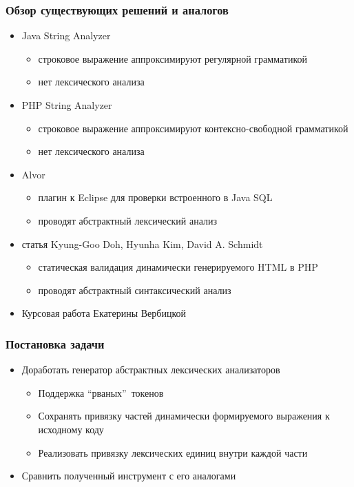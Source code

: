 \documentclass{beamer}
\begin{document}
\begin{frame}
	\transwipe[direction=90]
	\frametitle{Обзор существующих решений и аналогов}
	\begin{itemize}
		\item Java String Analyzer 
			\begin{itemize}
			\item строковое выражение аппроксимируют регулярной грамматикой
			\item нет лексического анализа
			\end{itemize}
		\item PHP String Analyzer
			\begin{itemize}
			\item строковое выражение аппроксимируют контексно-свободной грамматикой
			\item нет лексического анализа
			\end{itemize}
		\item Alvor
			\begin{itemize}
			\item  плагин к Eclipse для проверки встроенного в Java SQL 
			\item  проводят абстрактный лексический анализ
			\end{itemize}
		\item статья Kyung-Goo Doh, Hyunha Kim, David A. Schmidt
			\begin{itemize}
			\item  статическая валидация динамически генерируемого HTML в PHP
			\item  проводят абстрактный синтаксический анализ 
			\end{itemize}
		\item Курсовая работа Екатерины Вербицкой
	\end{itemize}
\end{frame}


\begin{frame}[fragile]
	\transwipe[direction=90]
	\frametitle{Постановка задачи}
	\begin{itemize}
	\item Доработать генератор абстрактных лексических анализаторов
		\begin{itemize}
	    	\item Поддержка “рваных”\ токенов
		    \item Сохранять привязку частей динамически формируемого выражения к исходному коду
		    \item Реализовать привязку лексических единиц внутри каждой части
	    \end{itemize}
    \item Сравнить полученный инструмент с его аналогами
    \end{itemize}
\end{frame}
\end{document}
